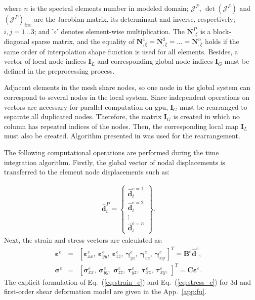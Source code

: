 %
where $n$ is the spectral elements number in modeled domain; \(\mathcal{J}^P\), \(\det\left(\mathcal{J}^P\right)\) and \(\left(\mathcal{J}^P\right)_{inv}\) are the Jacobian matrix, its determinant and inverse, respectively; $i,j=1\ldots3$; and '$\circ$' denotes element-wise multiplication.
The $\textbf{N}^P_{,\xi}$ is a block-diagonal sparse matrix, and the equality of $\textbf{N}^1_{,\xi}=\textbf{N}^2_{,\xi}=\ldots=\textbf{N}^n_{,\xi}$ holds if the same order of interpolation shape function is used for all elements.
Besides, a vector of local node indices $\textbf{I}_L$ and corresponding global node indices $\textbf{I}_G$ must be defined in the preprocessing process.

Adjacent elements in the mesh share nodes, so one node in the global system can correspond to several nodes in the local system.
Since independent operations on vectors are necessary for parallel computation on \ac{gpu}, $\textbf{I}_G$ must be rearranged to separate all duplicated nodes.
Therefore, the matrix $\textbf{I}_G$ is created in which no column has repeated indices of the nodes.
Then, the corresponding local map $\textbf{I}_L$ must also be created.
Algorithm presented in \cite{kudela2016parallel} was used for the rearrangement.

The following computational operations are performed during the time integration algorithm. Firstly, the global vector of nodal displacements is transferred to the element node displacements such as:

\begin{eqnarray}
	\widehat{\textbf{d}}_t^P = \left\{ \begin{array}{c}
		\widehat{\textbf{d}}_t^{e=1}\\
		\widehat{\textbf{d}}_t^{e=2}\\
		\vdots\\
		\widehat{\textbf{d}}_t^{e=n} \end{array}\right\}.
\end{eqnarray}
Next, the strain and stress vectors are calculated as:
\begin{eqnarray}
	\label{eq:strain_e}
	\boldsymbol{\varepsilon}^e & = & \left[\boldsymbol{\varepsilon}^e_{xx},\ \boldsymbol{\varepsilon}^e_{yy},\ \boldsymbol{\varepsilon}^e_{zz},\ \boldsymbol{\gamma}^e_{yz},\ \boldsymbol{\gamma}^e_{xz},\ \boldsymbol{\gamma}^e_{xy}\ \right]^T=\textbf{B}^e\widehat{\textbf{d}}^e,\\
	\label{eq:stress_e}
	\boldsymbol{\sigma}^e & = & \left[\boldsymbol{\sigma}^e_{xx},\ \boldsymbol{\sigma}^e_{yy},\ \boldsymbol{\sigma}^e_{zz},\ \boldsymbol{\tau}^e_{yz},\ \boldsymbol{\tau}^e_{xz},\ \boldsymbol{\tau}^e_{xy},\ \right]^T=\textbf{C}\boldsymbol{\varepsilon}^e.
\end{eqnarray}
The explicit formulation of Eq.~(\ref{eq:strain_e}) and Eq.~(\ref{eq:stress_e}) for \ac{3d} and first-order shear deformation model are given in the App.~\ref{app:fu}.

